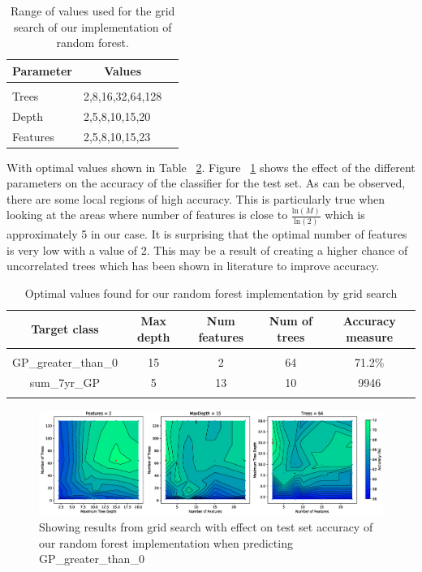 \documentclass{article} %
\begin{document}
\begin{table}[h]
\caption{Range of values used for the grid search of our implementation of random forest.}
\label{grid-params-table}
\begin{center}
\begin{tabular}{lll}
\multicolumn{1}{c}{\bf Parameter} &\multicolumn{1}{c}{\bf Values}
\\ \hline \\
Trees &2,8,16,32,64,128 \\
Depth &2,5,8,10,15,20 \\
Features &2,5,8,10,15,23 \\
\end{tabular}
\end{center}
\end{table}


With optimal values shown in Table ~\ref{opt-table}. Figure ~\ref{fig:gridSClass} shows the effect of the different parameters on the accuracy of the classifier for the test set. As can be observed, there are some local regions of high accuracy. This is particularly true when looking at the areas where number of features is close to $\frac{\text{ln}(M)}{\text{ln}(2)}$ which is approximately 5 in our case. It is surprising that the optimal number of features is very low with a value of 2. This may be a result of creating a higher chance of uncorrelated trees which has been shown in literature to improve accuracy. \cite{Bharathidason2014}

\begin{table}[h]
\caption{Optimal values found for our random forest implementation by grid search}
\begin{center}
\begin{tabular}{ccccc}
{\bf Target class} &{\bf Max depth} &{\bf Num features} &{\bf Num of trees}&{\bf Accuracy measure}
\\ \hline \\
GP\_greater\_than\_0         &15	&2	&64 &71.2\%\\
sum\_7yr\_GP         		&5	&13	&10 	&9946\\
\label{opt-table}
\end{tabular}
\end{center}
\end{table}

\begin{figure}[ht]
\includegraphics[width=1.1\textwidth]{gridSClass}
\caption{Showing results from grid search with effect on test set accuracy of our random forest implementation when predicting GP\_greater\_than\_0}
\label{fig:gridSClass}
\end{figure}
\end{document}
